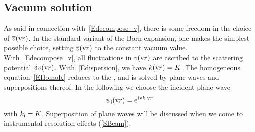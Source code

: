 %
%

\subsection{Vacuum solution}\label{Sfarfield}

%

As said in connection with~\cref{Edecompose_v},
there is some freedom in the choice of $\overline{v}(\text{v}{r})$.
In the standard variant of the Born expansion,
one makes the simplest possible choice,
setting $\overline{v}(\text{v}{r})$ to the constant vacuum value.
With~\cref{Edecompose_v},
all fluctuations in $v(\text{v}{r})$ are ascribed to the scattering potential~$\delta v(\text{v}{r})$.
With~\cref{Edispersion}, we have $k(\text{v}{r})=K$.
The homogeneous equation~\cref{EHomoK} reduces to the ,
%
%
and is solved by plane waves and superpositions thereof.
In the following we choose the incident plane wave
%
\begin{equation}\label{EPsi0Plane}
  \psi_{\text{i}}(\text{v}{r})=\mathrm e^{i \text{v}{k}_{\text{i}} \text{v}{r}}
\end{equation}
%
with $k_{\text{i}}=K$.
Superposition of plane waves
%
will be discussed when we come to instrumental resolution effects (\cref{SBeam}).
%
%


